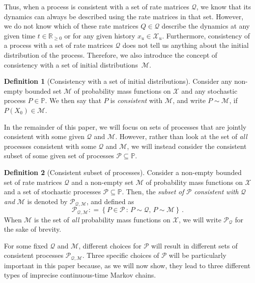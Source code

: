 \documentclass[10pt,a4paper]{paper}
\theoremstyle{definition}
\newtheorem{definition}{Definition}
\newcommand{\reals}{\mathbb{R}}
\newcommand{\realsnonneg}{\reals_{\geq 0}}
\newcommand{\states}{\mathcal{X}}
\newcommand{\processes}{\mathbb{P}}
\newcommand{\rateset}{\mathcal{Q}}
\newcommand{\coloneqq}{:\!=}
\begin{document}
Thus, when a process is consistent with a set of rate matrices $\rateset$, we know that its dynamics can always be described using the rate matrices in that set. However, we do not know which of these rate matrices $Q\in\rateset$ describe the dynamics at any given time $t\in\realsnonneg$ or for any given history $x_u\in\states_u$. 
Furthermore, consistency of a process with a set of rate matrices $\rateset$ does not tell us anything about the initial distribution of the process. 
Therefore, we also introduce the concept of consistency with a set of initial distributions~$\mathcal{M}$.

\begin{definition}[Consistency with a set of initial distributions]\label{def:consistent_process_initialdistribution}
Consider any non-empty bounded set $\mathcal{M}$ of probability mass functions on $\states$ and any stochastic process $P\in\processes$. We then say that $P$ is \emph{consistent} with $\mathcal{M}$, and write $P\sim\mathcal{M}$, if $P(X_0)\in\mathcal{M}$.
\end{definition}

In the remainder of this paper, we will focus on sets of processes that are jointly consistent with some given $\rateset$ and $\mathcal{M}$. However, rather than look at the set of \emph{all} processes consistent with some $\rateset$ and $\mathcal{M}$, we will instead consider the consistent subset of some given set of processes $\mathcal{P}\subseteq\processes$.


\begin{definition}[Consistent subset of processes]\label{def:consistent_process_set}
Consider a non-empty bounded set of rate matrices $\rateset$ and a non-empty set $\mathcal{M}$ of probability mass functions on $\states$ and a set of stochastic processes $\mathcal{P}\subseteq\processes$. Then, the \emph{subset of $\mathcal{P}$ consistent with} $\rateset$ \emph{and} $\mathcal{M}$ is denoted by $\mathcal{P}_{\rateset,\mathcal{M}}$, and defined as
\begin{equation*}
\mathcal{P}_{\rateset,\mathcal{M}} \coloneqq \left\{P\in\mathcal{P}\,:\,P\sim\rateset,\,P\sim\mathcal{M}\right\}\,.
\end{equation*}
When $\mathcal{M}$ is the set of \emph{all} probability mass functions on $\states$, we will write $\mathcal{P}_{\rateset}$ for the sake of brevity.
\end{definition}
For some fixed $\mathcal{Q}$ and $\mathcal{M}$, different choices for $\mathcal{P}$ will result in different sets of consistent processes $\mathcal{P}_{\rateset,\mathcal{M}}$. Three specific choices of $\mathcal{P}$ will be particularly important in this paper because, as we will now show, they lead to three different types of imprecise continuous-time Markov chains.
\end{document}

